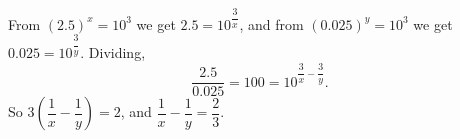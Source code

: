 From $(2.5)^x=10^3$ we get $2.5=10^{\dfrac{3}{x}}$, and from $(0.025)^y=10^3$ we get $0.025=10^{\dfrac{3}{y}}$. Dividing,
\[
\dfrac{2.5}{0.025}=100=10^{\dfrac{3}{x}-\dfrac{3}{y}}.
\]
So $3\left(\dfrac{1}{x}-\dfrac{1}{y}\right)=2$, and $\dfrac{1}{x}-\dfrac{1}{y}=\boxed{\dfrac{2}{3}}$.
